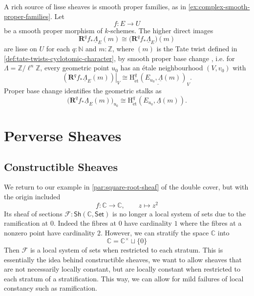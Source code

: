 \documentclass[11pt,letterpaper]{article}
\theoremstyle{numberfirstplain}
\numberwithin{equation}{theorem}
\theoremstyle{numberfirstupright}
\begin{document}
\begin{example}\label{ex:etale-smooth-proper-families}A rich source of lisse sheaves is smooth proper families, as in \cref{ex:complex-smooth-proper-families}. Let
$$f:E\rightarrow U$$
be a smooth proper morphism of $k$-schemes. 
The higher direct images
$$\mathbf R^q f_*\underline{\Lambda}_E(m)\cong\bigl(\mathbf R^q f_*\underline{\Lambda}_E\bigr)(m)$$
are lisse on $U$ for each $q:\mathbb N$ and $m:\mathbb Z$, where $(m)$ is the Tate twist defined in \cref{def:tate-twists-cyclotomic-character}, by smooth proper base change \cite[Theorem~20.2 and \S19]{Milne2013EtaleCohomology}, i.e. for $\Lambda=\mathbb Z/\ell^n\mathbb Z$, every geometric point $u_0$ has an \'{e}tale neighbourhood $(V,v_0)$ with
$$\left.(\mathbf R^q f_*\underline{\Lambda}_E(m))\right|_V\cong\underline{\mathrm H^q_{\mathrm{\acute{e}t}}(E_{u_0},\underline{\Lambda}(m))}_V.$$
Proper base change identifies the geometric stalks as
$$\bigl(\mathbf R^q f_*\underline{\Lambda}_E(m)\bigr)_{u_0}\cong\mathrm H^q_{\mathrm{\acute{e}t}}(E_{u_0},\underline{\Lambda}(m)).$$

\end{example}





\section{Perverse Sheaves}\label{sec:perverse-sheaves}
\subsection{Constructible Sheaves}

We return to our example in \cref{par:square-root-sheaf} of the double cover, but with the origin included
$$f:\mathbb C\rightarrow \mathbb C,\qquad z\mapsto z^2$$
Its sheaf of sections $\mathcal F:\mathsf{Sh}(\mathbb C,\mathsf{Set})$  is no longer a local system of sets due to the ramification at $0$. 
Indeed the fibres at $0$ have cardinality $1$ where the fibres at a nonzero point have cardinality $2$. 
However, we can stratify the space $\mathbb C$ into 
$$\mathbb C=\mathbb C^\times \sqcup \{0\}$$
Then $\mathcal F$ is a local system of sets when restricted to each stratum. This is essentially the idea behind constructible sheaves, we want to allow sheaves that are not necessarily locally constant, but are locally constant when restricted to each stratum of a stratification. 
This way, we can allow for mild failures of local constancy such as ramification. 
\end{document}
